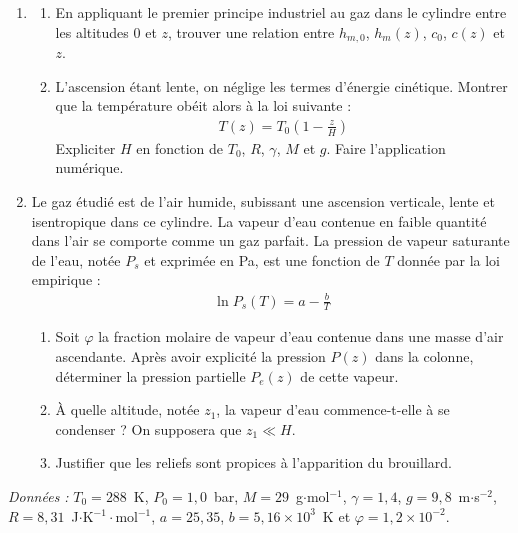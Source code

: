 \begin{enumerate}

\item

\begin{enumerate}

	\item En appliquant le premier principe industriel au gaz dans le cylindre entre les altitudes $0$ et $z$, trouver une relation entre $h_{m,0}$, $h_m(z)$, $c_0$, $c(z)$ et $z$.

	\item L'ascension étant lente, on néglige les termes d'énergie cinétique. Montrer que la température obéit alors à la loi suivante :
	\begin{align*}
		T(z)=T_0\left( 1-\frac{z}{H}\right)
	\end{align*}
	Expliciter $H$ en fonction de $T_0$, $R$, $\gamma$, $M$ et $g$. Faire l'application numérique.

\end{enumerate}

\item Le gaz étudié est de l'air humide, subissant une ascension verticale, lente et isentropique dans ce cylindre. La vapeur d'eau contenue en faible quantité dans l'air se comporte comme un gaz parfait. La pression de vapeur saturante de l'eau, notée $P_s$ et exprimée en Pa, est une fonction de $T$ donnée par la loi empirique :
\begin{align*}
	\ln P_s(T) = a -\frac{b}{T}
\end{align*}

\begin{enumerate}

	\item Soit $\varphi$ la fraction molaire de vapeur d'eau contenue dans une masse d'air ascendante. Après avoir explicité la pression $P(z)$ dans la colonne, déterminer la pression partielle $P_e(z)$ de cette vapeur.

	\item À quelle altitude, notée $z_1$, la vapeur d'eau commence-t-elle à se condenser ? On supposera que $z_1\ll H$.

	\item Justifier que les reliefs sont propices à l'apparition du brouillard.

\end{enumerate}

\end{enumerate}

\textit{Données :} $T_0=288$~K, $P_0=1{,}0$~bar, $M=29$~g$\cdot$mol$^{-1}$, $\gamma=1{,}4$, $g=9{,}8$~m$\cdot$s$^{-2}$, $R=8{,}31$~J$\cdot$K$^{-1}\cdot$mol$^{-1}$, $a=25{,}35$, $b=5{,}16\times10^{3}$~K et $\varphi=1{,}2\times10^{-2}$.

